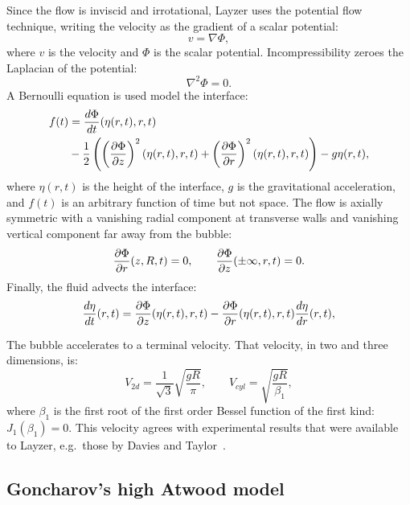 Since the flow is inviscid and irrotational, Layzer uses the potential flow technique, writing the velocity as the gradient of a scalar potential:
\begin{equation}
v = \nabla \Phi,
\end{equation}
where 
$v$ is the velocity and 
$\Phi$ is the scalar potential.
Incompressibility zeroes the Laplacian of the potential:
\begin{equation}
\nabla^2 \Phi = 0.
\end{equation}
A Bernoulli equation is used model the interface:
\begin{equation} \label{eqn:LayzerBernoulli}
\begin{aligned}
f(t) & = \frac{d \Phi}{d t}(\eta(r,t), r, t) \\
& - \frac{1}{2} \left(\left(\frac{\partial \Phi}{\partial z}\right)^2(\eta(r,t), r, t) +\left(\frac{\partial \Phi}{\partial r}\right)^2(\eta(r,t), r, t)\right) - g \eta(r,t),
\end{aligned}
\end{equation}
where 
$\eta(r,t)$ is the height of the interface,
$g$ is the gravitational acceleration, and 
$f(t)$ is an arbitrary function of time but not space.
The flow is axially symmetric with a vanishing radial component at transverse walls and vanishing vertical component far away from the bubble:
\begin{equation}
\frac{\partial \Phi}{\partial r}(z,R,t) = 0, \qquad \frac{\partial \Phi}{\partial z}(\pm \infty, r, t) = 0.
\end{equation}
Finally, the fluid advects the interface:
\begin{equation}
\frac{d \eta}{d t}(r,t) = \frac{\partial \Phi}{\partial z}(\eta(r,t), r, t) - \frac{\partial \Phi}{\partial r}(\eta(r,t), r, t) \frac{d \eta}{d r}(r,t),
\end{equation}

The bubble accelerates to a terminal velocity.
That velocity, in two and three dimensions, is:
\begin{equation}
V_{2d} = \frac{1}{\sqrt{3}} \sqrt{\frac{g R}{\pi}}, \qquad V_{cyl} = \sqrt{\frac{g R}{\beta_1}},
\end{equation}
where $\beta_1$ is the first root of the first order Bessel function of the first kind: $J_{1}(\beta_1) = 0$.
This velocity agrees with experimental results that were available to Layzer, e.g.\ those by Davies and Taylor~\cite{Davies1950a}.

\subsection{Goncharov's high Atwood model}

